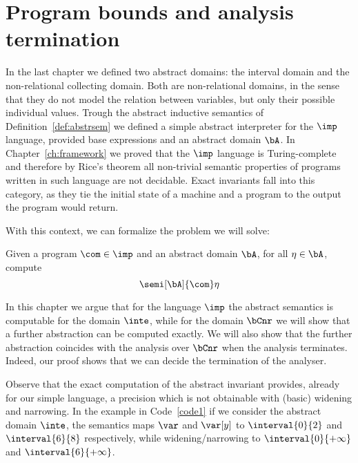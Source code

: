 \chapter{Program bounds and analysis termination}\label{ch:axiomatized}

In the last chapter we defined two abstract domains: the interval
domain and the non-relational collecting domain. Both are
non-relational domains, in the sense that they do not model the
relation between variables, but only their possible individual
values. Trough the abstract inductive semantics of
Definition~\ref{def:abstrsem} we defined a simple abstract interpreter
for the \(\imp\) language, provided base expressions and an abstract
domain \(\bA\). In Chapter~\ref{ch:framework} we proved that the
\(\imp\) language is Turing-complete and therefore by Rice's theorem
all non-trivial semantic properties of programs written in such
language are not decidable.
Exact invariants fall into this category, as they tie the initial
state of a machine and a program to the output the program would
return.

With this context, we can formalize the problem we will solve:

\begin{problem}\label{problem1}
  Given a program \(\com\in \imp\) and an abstract domain \(\bA\), for
  all \(\eta \in \bA\), compute
  \begin{equation*}
    \semi[\bA]{\com} \eta
  \end{equation*}
\end{problem}

In this chapter we argue that for the language \(\imp\) the abstract
semantics is computable for the domain \(\inte\), while for the domain
\(\bCnr\) we will show that a further abstraction can be computed
exactly. We will also show that the further abstraction coincides with
the analysis over \(\bCnr\) when the analysis terminates. Indeed, our
proof shows that we can decide the termination of the analyser.

\medskip

Observe that the exact computation of the abstract invariant provides,
already for our simple language, a precision which is not obtainable
with (basic) widening and narrowing. In the example in
Code~\ref{code1} if we consider the abstract domain \(\inte\), the
semantics maps \(\var\) and \(\var[y]\) to \(\interval{0}{2}\) and
\(\interval{6}{8}\) respectively, while widening/narrowing to
\(\interval{0}{+\infty}\) and \(\interval{6}{+\infty}\).


